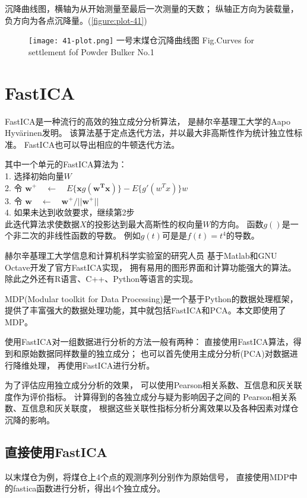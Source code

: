 沉降曲线图，横轴为从开始测量至最后一次测量的天数；
纵轴正方向为装载量，负方向为各点沉降量。(\ref{figure:plot-41})
\begin{figure}[!htbp]
   \centering
   \texttt{[image: 41-plot.png]}
				    {一号末煤仓沉降曲线图}
			{Fig.}{Curves for settlement fof Powder Bulker No.1}
\end{figure}

\section{FastICA}
FastICA是一种流行的高效的独立成分分析算法，
是赫尔辛基理工大学的Aapo Hyvärinen发明。
该算法基于定点迭代方法，并以最大非高斯性作为统计独立性标准。
FastICA也可以导出相应的牛顿迭代方法。

其中一个单元的FastICA算法为：\\
	1. 选择初始向量$W$ \\
	2. 令 $\bm{w}^{+} \quad \leftarrow 
			\quad E\{\bm{x}g(\bm{w^Tx})\} - E\{g'(w^Tx)\}w$ \\
	3. 令 $\bm{w} \quad \leftarrow \quad 
			\bm{w}^{+}/||\bm{w}^{+}||$ \\
	4. 如果未达到收敛要求，继续第2步 \\
此迭代算法求使数据$X$的投影达到最大高斯性的权向量$W$的方向。
函数$g()$是一个非二次的非线性函数的导数。
例如$g(t)$可是是$f(t)=t^4$的导数。

赫尔辛基理工大学信息和计算机科学实验室的研究人员
基于Matlab和GNU Octave开发了官方FastICA实现，
拥有易用的图形界面和计算功能强大的算法。
除此之外还有R语言、C++、Python等语言的实现。

MDP(Modular toolkit for Data Processing)是一个基于Python的数据处理框架，
提供了丰富强大的数据处理功能，其中就包括FastICA和PCA。本文即使用了MDP。

使用FastICA对一组数据进行分析的方法一般有两种：
直接使用FastICA算法，得到和原始数据同样数量的独立成分；
也可以首先使用主成分分析(PCA)对数据进行降维处理，
再使用FastICA进行分析。

为了评估应用独立成分分析的效果，
可以使用Pearson相关系数、互信息和灰关联度作为评价指标。
计算得到的各独立成分与疑为影响因子之间的
Pearson相关系数、互信息和灰关联度，
根据这些关联性指标分析分离效果以及各种因素对煤仓沉降的影响。

\subsection{直接使用FastICA}
以末煤仓为例，将煤仓上4个点的观测序列分别作为原始信号，
直接使用MDP中的fastica函数进行分析，得出4个独立成分。

